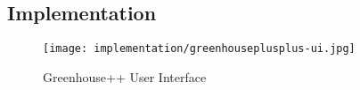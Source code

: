 \subsection{Implementation}\label{subsec:implementation}

\begin{figure}[h!]
    \texttt{[image: implementation/greenhouseplusplus-ui.jpg]}
    \caption{Greenhouse++ User Interface}
    \label{greenhouseplusplus:ui}
\end{figure}